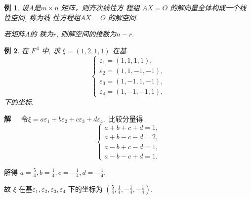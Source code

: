 \documentclass[13pt]{beamer}
\newtheorem{exa}{例}
\def\sol{{\bf 解~~ }}
\begin{document}
\begin{frame}
\begin{exa}
设$A$是$m \times n$ 矩阵，则齐次线性方 程组
$A X= O$
的解向量全体构成一个线性空间, 称为线 性方程组$AX = O$ 的解空间.

若矩阵$A$的 秩为$r$, 则解空间的维数为$n - r$.
\end{exa}
\end{frame}

\begin{frame}
\begin{exa}
在 $F^{\, 4}$ 中, 求 $\xi=(1,2,1,1)$ 在基
\[
\left\{\begin{array}{l}
\varepsilon_{1}=(1,1,1,1), \\
\varepsilon_{2}=(1,1,-1,-1), \\
\varepsilon_{3}=(1,-1,1,-1), \\
\varepsilon_{4}=(1,-1,-1,1),
\end{array}\right.
\]下的坐标.
\end{exa}

\end{frame}

\begin{frame}

\sol 令$\xi =a \varepsilon_1+b \varepsilon_2+c \varepsilon_3+d \varepsilon_4,$ 比较分量得
$$
\left\{\begin{array}{l}
a+b+c+d=1, \\
a+b-c-d=2, \\
a-b+c-d=1, \\
a-b-c+d=1.
\end{array}\right.
$$

解得 $a=\frac{5}{4}, b=\frac{1}{4}, c=-\frac{1}{4}, d=-\frac{1}{4}.$ 

故 $\xi$ 在基$\varepsilon_1, \varepsilon_{2}, \varepsilon_{3}, \varepsilon_{4}$ 下的坐标为
$\left(\frac{5}{4}, \frac{1}{4},-\frac{1}{4},-\frac{1}{4}\right).$
\end{frame}
\end{document}
